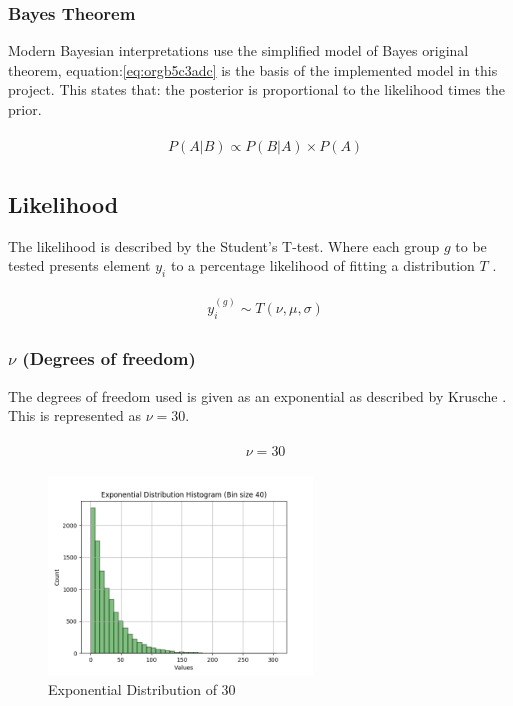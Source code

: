 \documentclass[11pt]{report}
\begin{document}
\subsubsection{Bayes Theorem}
\label{sec:org3f86159}

Modern Bayesian interpretations use the simplified model of Bayes original theorem, equation:\ref{eq:orgb5c3adc} is the basis of the implemented model in this project. This states that: the posterior is proportional to the likelihood times the prior.

\begin{align}
\label{eq:orgb5c3adc}
  &\begin{aligned}
  P(A|B) \propto P(B|A) \times P(A)
  \end{aligned}
\end{align}


\subsection{Likelihood}
\label{sec:orgacc7943}
The likelihood is described by the Student's T-test. Where each group \(g\) to be tested presents element \(y_i\) to a percentage likelihood of fitting a distribution \(T\) .

 \begin{align}
\label{eq:orge3dbe27}
   &\begin{aligned}
y_i^{(g)} \sim T(\nu, \mu, \sigma)
   \end{aligned}
 \end{align}

\subsubsection{\(\nu\) (Degrees of freedom)}
\label{sec:orgd245977}
The degrees of freedom used is given as an exponential as described by
Krusche \cite{Kruschke2012}. This is represented as \(\nu = 30\).

 \begin{align}
\label{eq:org8317771}
   &\begin{aligned}
\nu = 30
   \end{aligned}
 \end{align}

\begin{figure}[htbp]
\centering
\includegraphics[width=7cm]{./images/dist2.png}
\caption{\label{fig:org498ab03}
Exponential Distribution of 30}
\end{figure}
\end{document}
